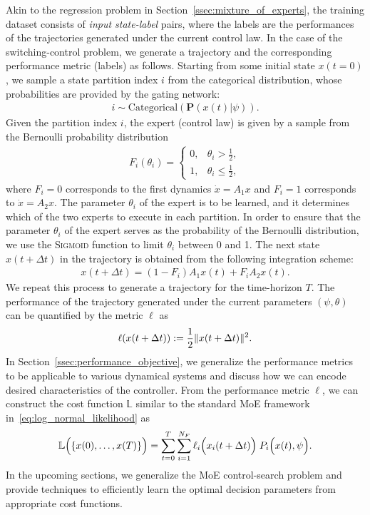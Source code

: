 Akin to the regression problem in Section~\ref{ssec:mixture_of_experts}, the
training dataset consists of \textit{input state-label} pairs, where the labels are
the performances of the trajectories generated under the current control law.
% 
In the case of the switching-control problem, we generate a trajectory and the
corresponding performance metric (labels) as follows.
%
Starting from some initial state $x(t=0)$, we sample a state partition index $i$
from the categorical distribution, whose probabilities are provided by the
gating network:
\begin{align}
    i  \sim \text{Categorical} (\mathbf{P}(x(t)| \psi)).
    \label{eq:gating_categorical}
\end{align} 
Given the partition index $i$, the expert (control law) is given by a sample
from the Bernoulli probability distribution
\begin{align}
    F_i(\theta_i) = \begin{cases}
       0, & \theta_i > \frac{1}{2}, \\
       1, & \theta_i \leq \frac{1}{2},
    \end{cases}
    \label{eq:bernoulli}
\end{align}
\noindent where $F_i = 0$ corresponds to the first dynamics $\dot{x} = A_1 x$
and $F_i=1$ corresponds to $\dot{x} = A_2x$. The parameter $\theta_i$ of the
expert is to be learned, and it determines which of the two experts to
execute in each partition.
%
In order to ensure that the parameter $\theta_i$ of the expert serves as the
probability of the Bernoulli distribution, we use the \textsc{Sigmoid}
function\cite{sharma2017activation} to limit $\theta_i$ between 0 and 1.
%
The next state $x(t+\Delta t)$ in the trajectory is obtained from the following
integration scheme:
\begin{align*}
    x(t + \Delta t) = (1-F_i) A_1 x(t) + F_i A_2 x(t).
\end{align*}
%
We repeat this process to generate a trajectory for the time-horizon $T$.
%
The performance of the trajectory generated under the current parameters $(\psi,
\theta)$ can be quantified by the metric $\ell$ as
\begin{align*}
    \ell(x(t + \Delta t)) := \frac{1}{2} \|{x(t + \Delta t)}\|_{{}_{}}^2.
\end{align*}
In Section~\ref{ssec:performance_objective}, we generalize the performance
metrics to be applicable to various dynamical systems and discuss how we can
encode desired characteristics of the controller.
%
From the performance metric $\ell$, we can construct the cost function
$\mathbb{L}$ similar to the standard MoE framework
in~\eqref{eq:log_normal_likelihood} as
\begin{align*}
    \mathbb{L} \Bigl(\{x(0), \dots, x(T)\} \Bigr)= \sum_{t=0}^{T} \sum_{i=1}^{N_F} \ell_i \Bigl(x_i(t + \Delta t) \Bigr) \; P_i \Bigl(x(t), \psi \Bigr) .
\end{align*}
\noindent In the upcoming sections, we generalize the MoE control-search
problem and provide techniques to efficiently learn the optimal decision
parameters from appropriate cost functions.



